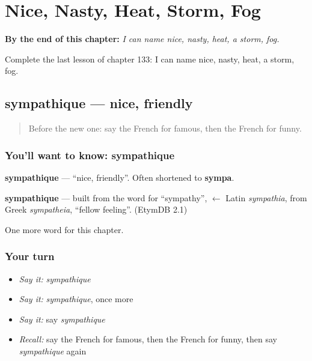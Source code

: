 
\chapter{Nice, Nasty, Heat, Storm, Fog}
\label{ch:fr-nice-nasty-heat-storm-fog}

\begin{chapteropening}
\textbf{By the end of this chapter:} \emph{I can name nice, nasty, heat, a storm, fog.}

Complete the last lesson of chapter 133: I can name nice, nasty, heat, a storm, fog.
\end{chapteropening}

\section[sympathique]{sympathique — nice, friendly}

\label{lesson:FR-C133-sympathique}



\begin{quote}
Before the new one: say the French for famous, then the French for funny.
\end{quote}

\subsection*{You'll want to know: sympathique}
\textbf{sympathique} — \textquotedblleft{}nice, friendly\textquotedblright{}. Often shortened to \textbf{sympa}.

\begin{cousinweb}
\textbf{sympathique} — built from the word for \textquotedblleft{}sympathy\textquotedblright{}, $\leftarrow$ Latin \emph{sympathia}, from Greek \emph{sympatheia}, \textquotedblleft{}fellow feeling\textquotedblright{}. (EtymDB 2.1)
\end{cousinweb}

\begin{grammarlens}[title={What you've built}]
One more word for this chapter.
\end{grammarlens}

\subsection*{Your turn}
\begin{itemize}
\raggedright
  \item \emph{Say it:} \emph{sympathique}
  \item \emph{Say it:} \emph{sympathique}, once more
  \item \emph{Say it:} say \emph{sympathique}
  \item \emph{Recall:} say the French for famous, then the French for funny, then say \emph{sympathique} again
\end{itemize}

